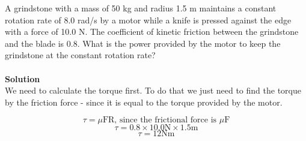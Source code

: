 \documentclass[9pt,addpoints]{exam}
\begin{document}
	\begin{questions}
		\question A grindstone with a mass of 50 kg and radius 1.5 m maintains a constant rotation rate of 8.0 rad/s by a motor while a knife is pressed against the edge with a force of 10.0 N. The coefficient of kinetic friction between the grindstone and the blade is 0.8. What is the power provided by the motor to keep the grindstone at the constant rotation rate? \\ \\
		\textbf{Solution} \\
		We need to calculate the torque first. To do that we just need to find the torque by the friction force - since it is equal to the torque  provided by the motor.
		
		$$\tau=\mu\text{FR}\text{, since the frictional force is }\mu\text{F}$$
		$$\tau=0.8\times10.0\text{N}\times1.5\text{m}$$
		$$\tau=12\text{Nm}$$
		

\end{questions}
\end{document}
